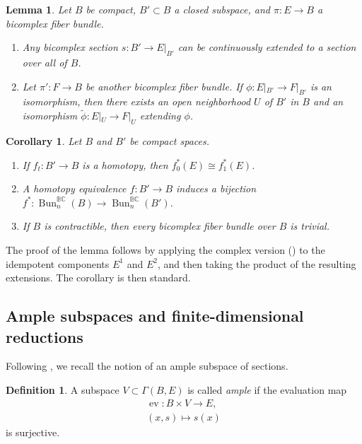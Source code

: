 \documentclass[11pt]{amsart}
\newcommand{\BC}{\mathbb{BC}}       %
\newcommand{\Bun}[1][n]{\operatorname{Bun}_#1^\BC(B)}
\newcommand{\ev}{\operatorname{ev}}  %
\newtheorem{lem}[prop]{Lemma}
\newtheorem{cor}[prop]{Corollary}         %
\theoremstyle{definition}
\newtheorem{defn}[prop]{Definition}       %
\begin{document}
\begin{lem}
    Let $B$ be compact, $B' \subset B$ a closed subspace, and $\pi:E \to B$ a bicomplex fiber bundle.
    \begin{enumerate}
        \item Any bicomplex section $s:B' \to E|_{B'}$ can be continuously extended to a section over all of $B$.
        \item Let $\pi':F \to B$ be another bicomplex fiber bundle. If $\phi:E|_{B'} \to F|_{B'}$ is an isomorphism, then there exists an open neighborhood $U$ of $B'$ in $B$ and an isomorphism $\widetilde{\phi}:E|_U \to F|_U$ extending $\phi$.
    \end{enumerate}
\end{lem}

\begin{cor}\label{cor:homotopy_compact}
    Let $B$ and $B'$ be compact spaces.
    \begin{enumerate}
        \item If $f_t:B' \to B$ is a homotopy, then $f_0^*(E) \cong f_1^*(E)$.
        \item A homotopy equivalence $f:B' \to B$ induces a bijection $f^*:\Bun[n]\to\operatorname{Bun}_n^\BC(B')$.
        \item If $B$ is contractible, then every bicomplex fiber bundle over $B$ is trivial.
    \end{enumerate}
\end{cor}

The proof of the lemma follows by applying the complex version (\cite[Lemmas 1.4.1 and 1.4.2]{Ati1967}) to the idempotent components $E^1$ and $E^2$, and then taking the product of the resulting extensions. The corollary is then standard.

\subsection{Ample subspaces and finite-dimensional reductions}

Following \cite[Lemma~1.4.12]{Ati1967}, we recall the notion of an ample subspace of sections.

\begin{defn}
    A subspace $V \subset \Gamma(B,E)$ is called \emph{ample} if the evaluation map
    \begin{gather*}
        \ev : B \times V \to E, \\ (x,s) \mapsto s(x)
    \end{gather*}
    is surjective.
\end{defn}
\end{document}
